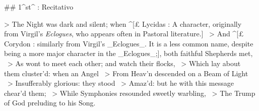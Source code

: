 ## 1^st^ \mvmt: Recitativo


> The Night was dark and silent; when ^[£ Lycidas : A character, originally from Virgil's \textit{Eclogues}, who appears often in Pastoral literature.] \
> And ^[£ Corydon : similarly from Virgil's _Eclogues_. It is a less common name, despite being a more major character in the _Eclogues_;], both faithful Shepherds met,  \
> As wont to meet each other; and watch their flocks,  \
> Which lay about them cluster’d: when an Angel  \
> From Heav’n descended on a Beam of Light  \
> Insufferably glorious: they stood  \
> Amaz’d: but he with this message chear’d them;  \
> While Symphonies resounded sweetly warbling,  \
> The Trump of God preluding to his Song.
